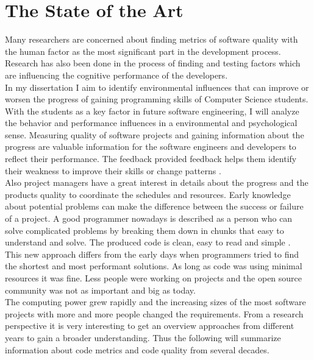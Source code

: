 \chapter{The State of the Art}

\begin{flushleft}
Many researchers are concerned about finding metrics of software quality with the human factor as the most significant part in the development process. 
Research has also been done in the process of finding and testing factors which are influencing the cognitive performance of the developers.\\
In my dissertation I aim to identify environmental influences that can improve or worsen the progress of gaining programming skills of Computer Science students.
With the students as a key factor in future software engineering, I will analyze the behavior and performance influences in a environmental and psychological sense. \cite{denissen2008effects}
Measuring quality of software projects and gaining information about the progress are valuable information for the software engineers and developers to reflect their performance. The feedback provided feedback helps them identify their weakness to improve their skills or change patterns \cite{johnson1999leap} \cite{Martin:2008:CCH:1388398}.\\
Also project managers have a great interest in details about the progress and the products quality to coordinate the schedules and resources.
Early knowledge about potential problems can make the difference between the success or failure of a project.
\bigbreak
A good programmer nowadays is described as a person who can solve complicated problems by breaking them down in chunks that easy to understand and solve. The produced code is clean, easy to read and simple \cite{johnson1999leap}.\\
This new approach differs from the early days when programmers tried to find the shortest and most performant solutions. As long as code was using minimal resources it was fine. Less people were working on projects and the open source community was not as important and big as today. \\
The computing power grew rapidly and the increasing sizes of the most software projects with more and more people changed the requirements. 
From a research perspective it is very interesting to get an overview approaches from different years to gain a broader understanding. Thus the following will summarize information about code metrics and code quality from several decades.
\end{flushleft}

